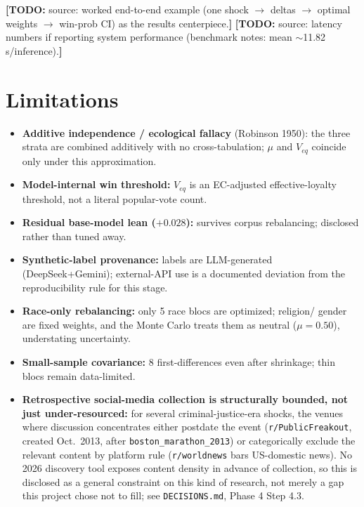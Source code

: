 \documentclass[11pt]{article}
\newcommand{\todo}[1]{{\color{red}\textbf{[TODO:} #1\textbf{]}}}
\begin{document}
\todo{source: worked end-to-end example (one shock $\rightarrow$ deltas $\rightarrow$
optimal weights $\rightarrow$ win-prob CI) as the results centerpiece.}
\todo{source: latency numbers if reporting system performance (benchmark notes:
mean $\sim$11.82\,s/inference).}

\section{Limitations}
\begin{itemize}
  \item \textbf{Additive independence / ecological fallacy} (Robinson 1950): the
        three strata are combined additively with no cross-tabulation; $\mu$ and
        $V_{eq}$ coincide only under this approximation.
  \item \textbf{Model-internal win threshold:} $V_{eq}$ is an EC-adjusted
        effective-loyalty threshold, not a literal popular-vote count.
  \item \textbf{Residual base-model lean ($+0.028$):} survives corpus rebalancing;
        disclosed rather than tuned away.
  \item \textbf{Synthetic-label provenance:} labels are LLM-generated
        (DeepSeek+Gemini); external-API use is a documented deviation from the
        reproducibility rule for this stage.
  \item \textbf{Race-only rebalancing:} only 5 race blocs are optimized; religion/
        gender are fixed weights, and the Monte Carlo treats them as neutral
        ($\mu{=}0.50$), understating uncertainty.
  \item \textbf{Small-sample covariance:} 8 first-differences even after
        shrinkage; thin blocs remain data-limited.
  \item \textbf{Retrospective social-media collection is structurally bounded,
        not just under-resourced:} for several criminal-justice-era shocks,
        the venues where discussion concentrates either postdate the event
        (\texttt{r/PublicFreakout}, created Oct.\ 2013, after
        \texttt{boston\_marathon\_2013}) or categorically exclude the relevant
        content by platform rule (\texttt{r/worldnews} bars US-domestic news).
        No 2026 discovery tool exposes content density in advance of
        collection, so this is disclosed as a general constraint on this kind
        of research, not merely a gap this project chose not to fill; see
        \texttt{DECISIONS.md}, Phase 4 Step 4.3.
\end{itemize}
\end{document}
